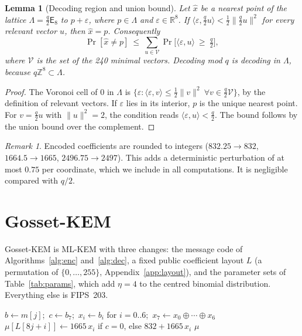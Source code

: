 \documentclass[11pt,a4paper]{article}
\newtheorem{lemma}[theorem]{Lemma}
\theoremstyle{definition}
\theoremstyle{remark}
\newtheorem{remark}[theorem]{Remark}
\newcommand{\Z}{\mathbb{Z}}
\newcommand{\R}{\mathbb{R}}
\newcommand{\E}{\mathsf{E}_8}
\begin{document}
\begin{lemma}[Decoding region and union bound]\label{lem:union}
Let $\hat x$ be a nearest point of the lattice $\Lambda=\tfrac q2\E$ to $p+\varepsilon$, where $p\in\Lambda$ and $\varepsilon\in\R^8$. If $\langle\varepsilon,\tfrac q2u\rangle<\tfrac12\|\tfrac q2u\|^2$ for every relevant vector $u$, then $\hat x=p$. Consequently
\[ \Pr[\hat x\neq p]\ \le\ \sum_{u\in\mathcal V}\Pr\!\Big[\langle\varepsilon,u\rangle\ \ge\ \tfrac q2\Big], \]
where $\mathcal V$ is the set of the 240 minimal vectors. Decoding mod $q$ is decoding in $\Lambda$, because $q\Z^8\subset\Lambda$.
\end{lemma}
\begin{proof}
The Voronoi cell of $0$ in $\Lambda$ is $\{\varepsilon:\langle\varepsilon,v\rangle\le\frac12\|v\|^2\ \forall v\in\tfrac q2\mathcal V\}$, by the definition of relevant vectors. If $\varepsilon$ lies in its interior, $p$ is the unique nearest point. For $v=\tfrac q2u$ with $\|u\|^2=2$, the condition reads $\langle\varepsilon,u\rangle<\tfrac q2$. The bound follows by the union bound over the complement.
\end{proof}

\begin{remark}
Encoded coefficients are rounded to integers ($832.25\to832$, $1664.5\to1665$, $2496.75\to2497$). This adds a deterministic perturbation of at most $0.75$ per coordinate, which we include in all computations. It is negligible compared with $q/2$.
\end{remark}

\section{Gosset-KEM}\label{sec:scheme}

Gosset-KEM is ML-KEM with three changes: the message code of Algorithms~\ref{alg:enc} and~\ref{alg:dec}, a fixed public coefficient layout $L$ (a permutation of $\{0,\dots,255\}$, Appendix~\ref{app:layout}), and the parameter sets of Table~\ref{tab:params}, which add $\eta=4$ to the centred binomial distribution. Everything else is FIPS~203.

\begin{algorithm}[t]
\caption{E8Encode$(m)$, $m\in\{0,1\}^{256}$ as 32 bytes}\label{alg:enc}
\begin{algorithmic}[1]
  \State $b\gets m[j]$;\ $c\gets b_7$;\ $x_i\gets b_i$ for $i=0..6$;\ $x_7\gets x_0\oplus\cdots\oplus x_6$
    \State $\mu[L[8j+i]]\gets 1665\,x_i$ if $c=0$, else $832+1665\,x_i$ 
  \EndFor
\EndFor
\State \Return $\mu$
\end{algorithmic}
\end{algorithm}
\end{document}
